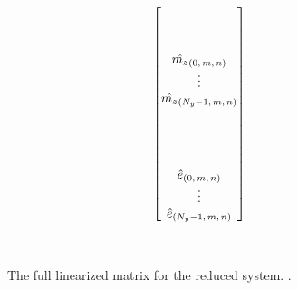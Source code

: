 \begin{sidewaysfigure}
{{\begin{minipage}[c]{\textwidth}
\begin{align*}
\begin{bmatrix}
\\%
\\%
\\%
  \hat{\mz}_{\left(0,\,m,\,n\right)} \\
  \vdots \\
  \hat{\mz}_{\left(N_y-1,\,m,\,n\right)} \\
\\%
\\%
\\%
\\%
  \hat{e}_{\left(0,\,m,\,n\right)} \\
  \vdots \\
  \hat{e}_{\left(N_y-1,\,m,\,n\right)} \\
%
\end{bmatrix}
\end{align*}
\end{minipage}}}  %
\vspace{2em}
\\
\caption[The discrete operator $M+\varphi{}L$ used for implicit time advance]
{
    The full linearized matrix for the reduced system.  . 
}
\label{fig:discreteimplicitop2}
\end{sidewaysfigure}


%
